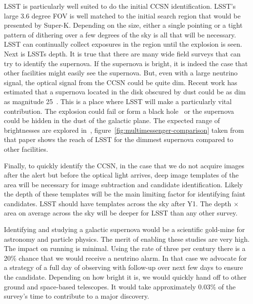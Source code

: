 \documentclass[12pt, letterpaper]{article}
\newcommand{\superk}  {Super\nobreakdash-K\xspace}
\begin{document}
LSST is particularly well suited to do the initial CCSN
identification.  LSST's large 3.6 degree FOV is well matched to the
initial search region that would be presented by \superk.  Depending
on the size, either a single pointing or a tight pattern of dithering
over a few degrees of the sky is all that will be necessary.  LSST can
continually collect exposures in the region until the explosion is
seen. Next is LSSTs depth. It is true that there are many wide field
surveys that can try to identify the supernova.  If the supernova is
bright, it is indeed the case that other facilities might easily see
the supernova.  But, even with a large neutrino signal, the optical
signal from the CCSN could be quite dim.  Recent work has estimated
that a supernova located in the disk obscured by dust could be as dim
as magnitude 25~\cite{2016MNRAS.461.3296N}.  This is a place where
LSST will make a particularly vital contribution.  The explosion could
fail or form a black hole~\cite{2011ApJ...730...70O,
  2017hsn..book.1555O} or the supernova could be hidden in the dust of
the galactic plane.  The expected range of brightnesses are explored
in~\cite{2016MNRAS.461.3296N},
figure~\ref{fig:multimessenger-comparison} taken from that paper shows
the reach of LSST for the dimmest supernova compared to other
facilities.

Finally, to quickly identify the CCSN, in the case that we do not
acquire images after the alert but before the optical light arrives,
deep image templates of the area will be necessary for image
subtraction and candidate identification.  Likely the depth of these
templates will be the main limiting factor for identifying faint
candidates.  LSST should have templates across the sky after Y1.  The
depth $\times$ area on average across the sky will be deeper for LSST
than any other survey.

Identifying and studying a galactic supernova would be a scientific
gold-mine for astronomy and particle physics.  The merit of enabling
these studies are very high. The impact on running is minimal.  Using
the rate of three per century there is a 20\% chance that we would
receive a neutrino alarm. In that case we advocate for a strategy of a
full day of observing with follow-up over next few days to ensure the
candidate.  Depending on how bright it is, we would quickly hand off
to other ground and space-based telescopes.  It would take
approximately 0.03\% of the survey's time to contribute to a major
discovery.

\clearpage
\end{document}

